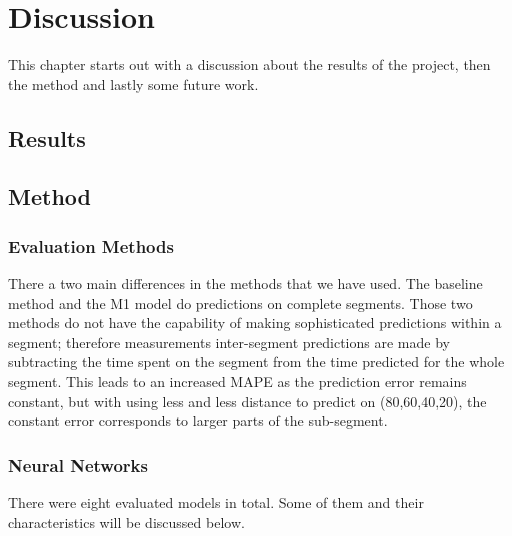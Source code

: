 
\chapter{Discussion}
\label{cha:discussion}

This chapter starts out with a discussion about the results of the project, then the method and lastly some future work.

\section{Results}
\label{sec:discussion-results} 


\section{Method}
\label{sec:discussion-method}
\subsection{Evaluation Methods}
There a two main differences in the methods that we have used. The baseline method and the M1 model do predictions on complete segments. Those two methods do not have the capability of making sophisticated predictions within a segment; therefore measurements inter-segment predictions are made by subtracting the time spent on the segment from the time predicted for the whole segment. This leads to an increased MAPE as the prediction error remains constant, but with using less and less distance to predict on (80,60,40,20), the constant error corresponds to larger parts of the sub-segment.

\subsection{Neural Networks}
There were eight evaluated models in total. Some of them and their characteristics will be discussed below.

